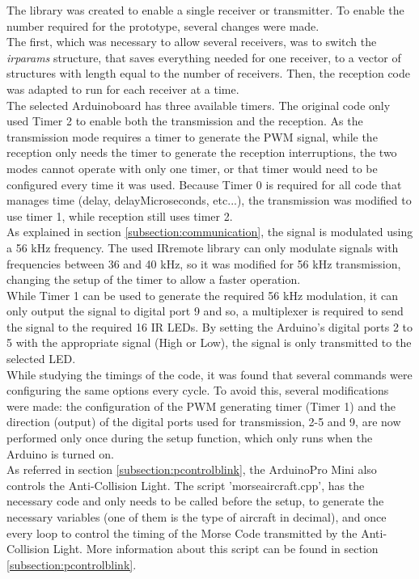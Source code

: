 The library was created to enable a single receiver or transmitter. To enable the number required for the prototype, several changes were made.\\
The first, which was necessary to allow several receivers, was to switch the \textit{irparams} structure, that saves everything needed for one receiver, to a vector of structures with length equal to the number of receivers. Then, the reception code was adapted to run for each receiver at a time.\\
The selected Arduino\texttrademark board has three available timers. The original code only used Timer 2 to enable both the transmission and the reception. As the transmission mode requires a timer to generate the PWM signal, while the reception only needs the timer to generate the reception interruptions, the two modes cannot operate with only one timer, or that timer would need to be configured every time it was used. Because Timer 0 is required for all code that manages time (delay, delayMicroseconds, etc...), the transmission was modified to use timer 1, while reception still uses timer 2.\\
As explained in section \ref{subsection:communication}, the signal is modulated using a 56 kHz frequency. The used IRremote library can only modulate signals with frequencies between 36 and 40 kHz, so it was modified for 56 kHz transmission, changing the setup of the timer to allow a faster operation.\\
While Timer 1 can be used to generate the required 56 kHz modulation, it can only output the signal to digital port 9 and so, a multiplexer is required to send the signal to the required 16 IR LEDs. 
By setting the Arduino's digital ports 2 to 5 with the appropriate signal (High or Low), the signal is only transmitted to the selected LED.\\

While studying the timings of the code, it was found that several commands were configuring the same options every cycle. To avoid this, several modifications were made: the configuration of the PWM generating timer (Timer 1) and the direction (output) of the digital ports used for transmission, 2-5 and 9, are now performed only once during the setup function, which only runs when the Arduino is turned on. \\ 

As referred in section \ref{subsection:pcontrolblink}, the Arduino\texttrademark Pro Mini also controls the Anti-Collision Light. The script 'morseaircraft.cpp', has the necessary code and only needs to be called before the setup, to generate the necessary variables (one of them is the type of aircraft in decimal), and once every loop to control the timing of the Morse Code transmitted by the Anti-Collision Light. More information about this script can be found in section \ref{subsection:pcontrolblink}. \\

